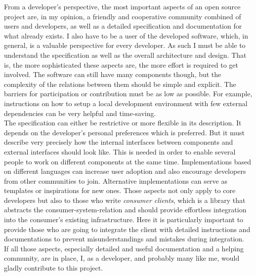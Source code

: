 \documentclass[12pt,english,a4paper,titlepage,cleardoublepage=empty,dottedtoc]{report}
\begin{document}
From a developer's perspective, the most important aspects of an open
source project are, in my opinion, a friendly and cooperative community
combined of users and developers, as well as a detailed specification
and documentation for what already exists. I also have to be a user of
the developed software, which, in general, is a valuable perspective for
every developer. As such I must be able to understand the specification
as well as the overall architecture and design. That is, the more
sophisticated these aspects are, the more effort is required to get
involved. The software can still have many components though, but the
complexity of the relations between them should be simple and explicit.
The barriers for participation or contribution must be as low as
possible. For example, instructions on how to setup a local development
environment with few external dependencies can be very helpful and
time-saving.\\
The specification can either be restrictive or more flexible in its
description. It depends on the developer's personal preferences which is
preferred. But it must describe very precisely how the internal
interfaces between components and external interfaces should look like.
This is needed in order to enable several people to work on different
components at the same time. Implementations based on different
languages can increase user adoption and also encourage developers from
other communities to join. Alternative implementations can serve as
templates or inspirations for new ones. Those aspects not only apply to
core developers but also to those who write \emph{consumer clients},
which is a library that abstracts the consumer-system-relation and
should provide effortless integration into the consumer's existing
infrastructure. Here it is particularly important to provide those who
are going to integrate the client with detailed instructions and
documentations to prevent misunderstandings and mistakes during
integration.\\
If all those aspects, especially detailed and useful documentation and a
helping community, are in place, I, as a developer, and probably many
like me, would gladly contribute to this project.
\end{document}
